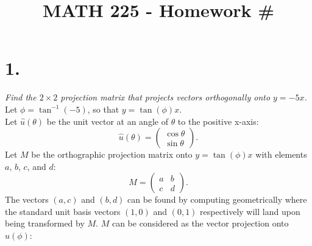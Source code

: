 \documentclass[12pt]{article}
\title{\vspace{-2\baselineskip}MATH 225 - Homework \#\HOMEWORKNUM}
\author{\NAME}
\date{\DATE}
\begin{document}
\maketitle

\section*{1.}
\textit{Find the $2 \times 2$ projection matrix that projects vectors
orthogonally onto $y = -5x$.} \\[\baselineskip]
Let $\phi = \tan^{-1}(-5)$, so that $y = \tan(\phi)x$. \\
Let $\hat u(\theta)$ be the unit vector at an angle of $\theta$ to the
positive x-axis:
\begin{equation*}
	\hat u(\theta) = \begin{pmatrix} \cos \theta \\ \sin \theta \end{pmatrix}
	.
\end{equation*}
Let $M$ be the orthographic projection matrix onto $y = \tan(\phi)x$ with
elements $a$, $b$, $c$, and $d$:
\begin{equation*}
	M = \begin{pmatrix} a & b \\ c & d \end{pmatrix}
	.
\end{equation*}
The vectors $(a, c)$ and $(b, d)$ can be found by computing geometrically
where the standard unit basis vectors $(1, 0)$ and $(0, 1)$ respectively will
land upon being transformed by $M$. $M$ can be considered as the vector
projection onto $\hat u(\phi)$:
\footnotesize
\end{document}
